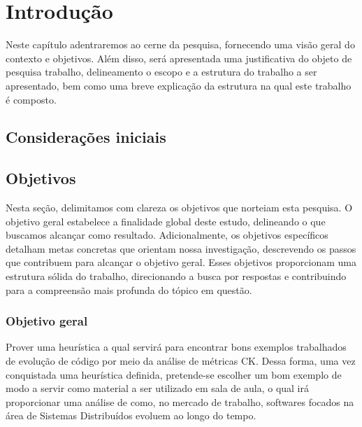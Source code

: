 
\chapter{Introdução}\label{cap:introducao}

Neste capítulo adentraremos ao cerne da pesquisa, fornecendo uma visão geral do contexto e objetivos. Além disso, será apresentada uma justificativa do objeto de pesquisa trabalho, delineamento o escopo e a estrutura do trabalho a ser apresentado, bem como uma breve explicação da estrutura na qual este trabalho é composto. 

\section{Considerações iniciais}\label{sec:consideracoesIniciais}

\section{Objetivos}\label{sec:objetivos}

Nesta seção, delimitamos com clareza os objetivos que norteiam esta pesquisa. O objetivo geral estabelece a finalidade global deste estudo, delineando o que buscamos alcançar como resultado. Adicionalmente, os objetivos específicos detalham metas concretas que orientam nossa investigação, descrevendo os passos que contribuem para alcançar o objetivo geral. Esses objetivos proporcionam uma estrutura sólida do trabalho, direcionando a busca por respostas e contribuindo para a compreensão mais profunda do tópico em questão.

\subsection{Objetivo geral}\label{subsec:objetivoGeral}

Prover uma heurística a qual servirá para encontrar bons exemplos trabalhados de evolução de código por meio da análise de métricas CK. Dessa forma, uma vez conquistada uma heurística definida, pretende-se escolher um bom exemplo de modo a servir como material a ser utilizado em sala de aula, o qual irá proporcionar uma análise de como, no mercado de trabalho, softwares focados na área de Sistemas Distribuídos evoluem ao longo do tempo.

